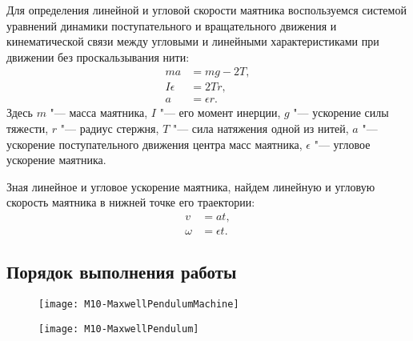 \documentclass[a4paper, 12pt]{extarticle}
\newcommand{\eps}{\epsilon}
\begin{document}
Для определения линейной и угловой скорости маятника воспользуемся системой уравнений динамики поступательного и вращательного движения и кинематической связи между угловыми и линейными характеристиками при движении без проскальзывания нити:
\begin{align*} %
ma &= mg - 2T, \\ %
I \eps &= 2Tr, \\
a &= \eps r.
\end{align*}
Здесь  $m$ "--- масса маятника, $I$ "--- его момент инерции, $g$ "--- ускорение силы тяжести, $r$ "--- радиус стержня, $T$ "--- сила натяжения одной из нитей, $a$ "--- ускорение поступательного движения центра масс маятника, $\eps$ "--- угловое ускорение маятника.

Зная линейное и угловое ускорение маятника, найдем линейную и угловую скорость маятника в нижней точке его траектории:
\begin{align*}
v &= at, \\%
\omega &= \eps t.
\end{align*}

\subsection{Порядок выполнения работы}

\begin{figure}[h]
\centering
\begin{minipage}[b]{0.45\linewidth}
\centering
\texttt{[image: M10-MaxwellPendulumMachine]}
\caption{\label{fig:m10-maxwell's-pendulum}}
\end{minipage} \hfill
\begin{minipage}[b]{0.45\linewidth}
\centering
\texttt{[image: M10-MaxwellPendulum]}
\caption{\label{fig:m10-wheel}}
\end{minipage}
\end{figure}

\end{document}
